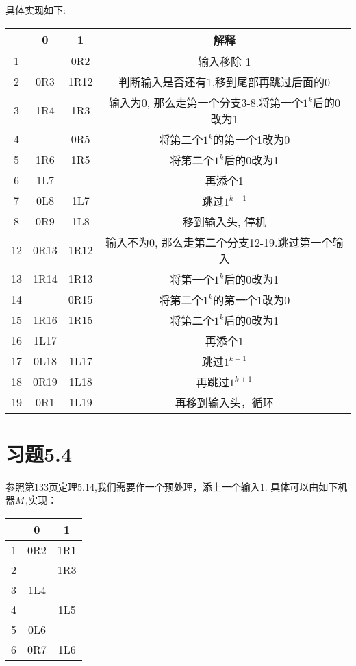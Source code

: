 \documentclass{article}
\begin{document}
具体实现如下:
\begin{center}
\begin{tabular}{|c|c|c|c|}
	\hline
	&0&1&解释\\
	\hline
	1&&0R2&输入移除     1\\
	2&0R3&1R12&判断输入是否还有1,移到尾部再跳过后面的0\\
	3&1R4&1R3&输入为0, 那么走第一个分支3-8.将第一个$1^k$后的0改为1\\
	4&&0R5&将第二个$1^k$的第一个1改为0\\
	5&1R6&1R5&将第二个$1^k$后的0改为1\\
	6&1L7&&再添个1\\
	7&0L8&1L7&跳过$1^{k+1}$\\
	8&0R9&1L8&移到输入头, 停机\\
	12&0R13&1R12&输入不为0, 那么走第二个分支12-19.跳过第一个输入\\
	13&1R14&1R13&将第一个$1^k$后的0改为1\\
	14&&0R15&将第二个$1^k$的第一个1改为0\\
	15&1R16&1R15&将第二个$1^k$后的0改为1\\
	16&1L17&&再添个1\\
	17&0L18&1L17&跳过$1^{k+1}$\\
	18&0R19&1L18&再跳过$1^{k+1}$\\
	19&0R1&1L19&再移到输入头，循环\\
		\hline
\end{tabular}
\end{center}
%
\section*{习题5.4}
 参照第133页定理5.14,我们需要作一个预处理，添上一个输入$\overline 1$. 具体可以由如下机器$M_3$实现：
\begin{center}
\begin{tabular}{|c|c|c|}
	\hline
	&0&1\\
	\hline
	1&0R2&1R1\\
	2&&1R3\\
	3&1L4&\\
	4&&1L5\\
	5&0L6&\\
	6&0R7&1L6
	\\
	\hline
\end{tabular}
\end{center}
\end{document}
